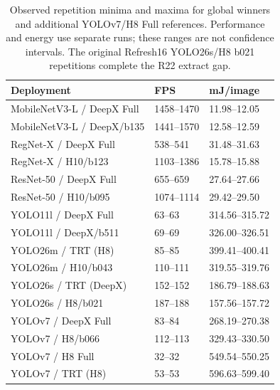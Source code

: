 \begin{table}[t]
\centering
\caption{Observed repetition minima and maxima for global winners and additional YOLOv7/H8 Full references. Performance and energy use separate runs; these ranges are not confidence intervals. The original Refresh16 YOLO26s/H8 b021 repetitions complete the R22 extract gap.}
\label{tab:winner-repeat-ranges}
\begingroup\small\setlength{\tabcolsep}{3pt}
\begin{tabular*}{\columnwidth}{@{\extracolsep{\fill}}l l l@{}}
\toprule
Deployment & FPS & mJ/image \\
\midrule
MobileNetV3-L / DeepX Full & 1458--1470 & 11.98--12.05 \\
MobileNetV3-L / DeepX/b135 & 1441--1570 & 12.58--12.59 \\
RegNet-X / DeepX Full & 538--541 & 31.48--31.63 \\
RegNet-X / H10/b123 & 1103--1386 & 15.78--15.88 \\
ResNet-50 / DeepX Full & 655--659 & 27.64--27.66 \\
ResNet-50 / H10/b095 & 1074--1114 & 29.42--29.50 \\
YOLO11l / DeepX Full & 63--63 & 314.56--315.72 \\
YOLO11l / DeepX/b511 & 69--69 & 326.00--326.51 \\
YOLO26m / TRT (H8) & 85--85 & 399.41--400.41 \\
YOLO26m / H10/b043 & 110--111 & 319.55--319.76 \\
YOLO26s / TRT (DeepX) & 152--152 & 186.79--188.63 \\
YOLO26s / H8/b021 & 187--188 & 157.56--157.72 \\
YOLOv7 / DeepX Full & 83--84 & 268.19--270.38 \\
YOLOv7 / H8/b066 & 112--113 & 329.43--330.50 \\
YOLOv7 / H8 Full & 32--32 & 549.54--550.25 \\
YOLOv7 / TRT (H8) & 53--53 & 596.63--599.40 \\
\bottomrule
\end{tabular*}
\endgroup
\end{table}
